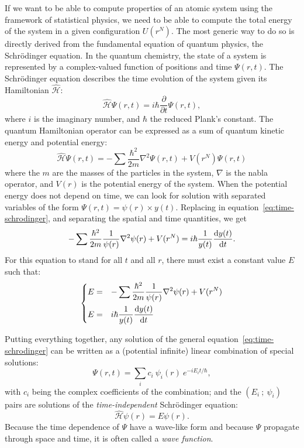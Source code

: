 \documentclass[thesis]{subfiles}
\begin{document}
If we want to be able to compute properties of an atomic system using the
framework of statistical physics, we need to be able to compute the total energy
of the system in a given configuration $U(r^N)$. The most generic way to do so
is directly derived from the fundamental equation of quantum physics, the
Schrödinger equation. In the quantum chemistry, the state of a system is
represented by a complex-valued function of positions and time $\Psi(r, t)$. The
Schrödinger equation describes the time evolution of the system given its
Hamiltonian $\hat{\mathcal{H}}$:
\[\hat{\mathcal{H}} \Psi(r, t) = i\hbar \frac{\partial}{\partial t} \Psi(r, t),\label{eq:time-schrodinger}\]
where $i$ is the imaginary number, and $\hbar$ the reduced Plank's constant. The
quantum Hamiltonian operator can be expressed as a sum of quantum kinetic energy
and potential energy:
\[\hat{\mathcal{H}} \Psi(r, t) = - \sum \frac{\hbar^2}{2m} \nabla^2 \Psi(r, t) + V(r^N)\Psi(r, t)\]
where the $m$ are the masses of the particles in the system, $\nabla$ is the
nabla operator, and $V(r)$ is the potential energy of the system. When the
potential energy does not depend on time, we can look for solution with
separated variables of the form $\Psi(r, t) = \psi(r) \times y(t)$. Replacing in
equation~\eqref{eq:time-schrodinger}, and separating the spatial and time
quantities, we get
\[- \sum \frac{\hbar^2}{2m} \frac{1}{\psi(r)} \nabla^2 \psi(r) + V(r^N) = i\hbar \frac{1}{y(t)} \frac{\text{d} y(t)}{\text{d} t}.\]
For this equation to stand for all $t$ and all $r$, there must exist a constant
value $E$ such that:
\[\begin{dcases}
    E =& - \sum \frac{\hbar^2}{2m} \frac{1}{\psi(r)} \nabla^2 \psi(r) + V(r^N) \\
    E =& i\hbar \frac{1}{y(t)} \frac{\text{d} y(t)}{\text{d} t} \\
\end{dcases}\]

Putting everything together, any solution of the general
equation~\eqref{eq:time-schrodinger} can be written as a (potential infinite)
linear combination of special solutions:
\[\Psi(r, t) = \sum_i c_i \ \psi_i(r) \ e^{-i E_i t / \hbar},\]
with $c_i$ being the complex coefficients of the combination; and the $(E_i\ ;\
\psi_i)$ pairs are solutions of the \emph{time-independent} Schrödinger equation:
\[\hat{\mathcal{H}} \psi(r) = E \psi(r).\label{eq:schrodinger}\]
Because the time dependence of $\Psi$ have a wave-like form and because $\Psi$
propagate through space and time, it is often called a \emph{wave function}.
\end{document}
